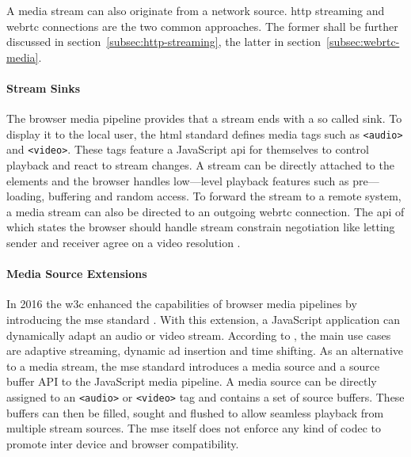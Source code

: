 A media stream can also originate from a network source. \Gls{http} streaming and \gls{webrtc} connections are the two common approaches. The former shall be further discussed in section~\ref{subsec:http-streaming}, the latter in section~\ref{subsec:webrtc-media}.

\paragraph{Stream Sinks}

The browser media pipeline provides that a stream ends with a so called sink. To display it to the local user, the \gls{html} standard \cite[\S4.7]{html-w3c} defines media tags such as \lstinline|<audio>| and \lstinline|<video>|. These tags feature a JavaScript \gls{api} for themselves to control playback and react to stream changes. A stream can be directly attached to the elements and the browser handles low—level playback features such as pre—loading, buffering and random access. To forward the stream to a remote system, a media stream can also be directed to an outgoing \gls{webrtc} connection. The \gls{api} of which states the browser should handle stream constrain negotiation like letting sender and receiver agree on a video resolution \cite[\S5.1]{webrtc-w3c}.

\paragraph{Media Source Extensions}

In 2016 the \gls{w3c} enhanced the capabilities of browser media pipelines by introducing the \gls{mse} standard \cite{media-source-extensions}. With this extension, a JavaScript application can dynamically adapt an audio or video stream. According to \cite{mse-google}, the main use cases are adaptive streaming, dynamic ad insertion and time shifting. As an alternative to a media stream, the \gls{mse} standard introduces a media source and a source buffer API to the JavaScript media pipeline. A media source can be directly assigned to an \lstinline|<audio>| or \lstinline|<video>| tag and contains a set of source buffers. These buffers can then be filled, sought and flushed to allow seamless playback from multiple stream sources. The \gls{mse} itself does not enforce any kind of codec to promote inter device and browser compatibility.

